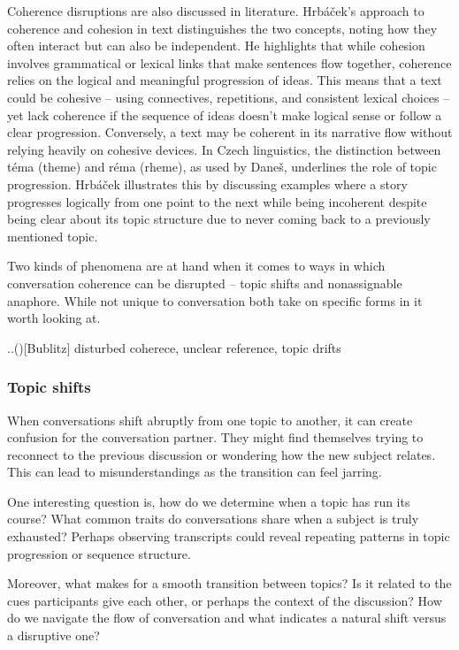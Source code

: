 \documentclass[12pt]{report}
\begin{document}
{\par
Coherence disruptions are also discussed in literature.
Hrbáček’s approach to coherence and cohesion in text distinguishes the two concepts,
noting how they often interact but can also be independent.
He highlights that while
cohesion involves grammatical or lexical links that
make sentences flow together,
coherence relies on the logical and meaningful progression of ideas.
This means that a text could be cohesive –
using connectives, repetitions, and consistent lexical choices –
yet lack coherence if the sequence of ideas doesn’t
make logical sense or follow a clear progression.
Conversely, a text may be coherent in its narrative flow without
relying heavily on cohesive devices.
In Czech linguistics,
the distinction between téma (theme) and réma (rheme), as used by Daneš,
underlines the role of topic progression.
Hrbáček illustrates this by discussing examples where
a story progresses logically from one point to the next while
being incoherent despite being clear about its topic structure
due to never coming back to a previously mentioned topic.

\par
Two kinds of phenomena are at hand when it comes to
ways in which conversation coherence can be disrupted –
topic shifts and nonassignable anaphore.
While not unique to conversation
both take on specific forms in it worth looking at.

..()[Bublitz] disturbed coherece, unclear reference, topic drifts

\subsubsection{Topic shifts}
\par
    When conversations shift abruptly from one topic to another,
    it can create confusion for the conversation partner.
    They might find themselves trying to
    reconnect to the previous discussion or
    wondering how the new subject relates.
    This can lead to misunderstandings
    as the transition can feel jarring.

\par
    One interesting question is,
    how do we determine when a topic has run its course?
    What common traits do conversations share when a subject is truly exhausted?
    Perhaps observing transcripts could reveal repeating patterns in topic progression or sequence structure.

\par
    Moreover, what makes for a smooth transition between topics?
    Is it related to the cues participants give each other,
    or perhaps the context of the discussion?
    How do we navigate the flow of conversation and
    what indicates a natural shift versus a disruptive one?

}
\end{document}

